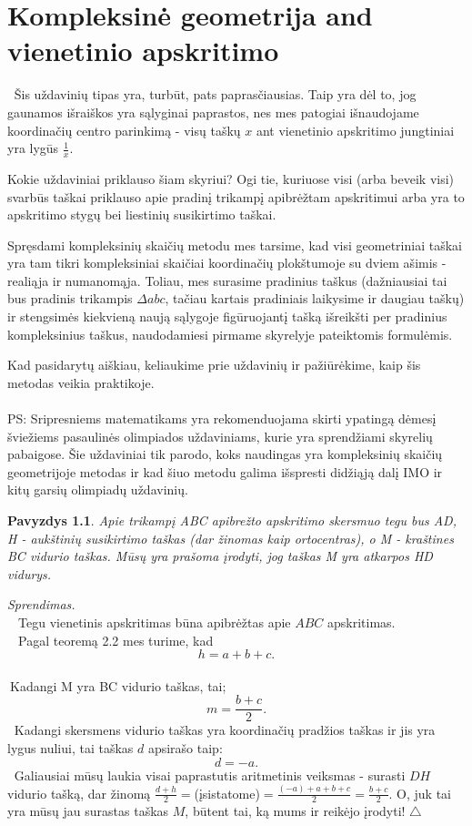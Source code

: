 \documentclass[11pt,a4paper,twoside]{book}
\newenvironment{sprendimas}{\noindent \textit{Sprendimas.}}{\hfill $\triangle$}
\newcounter{foo}[subsection]
\newtheorem{pavnr}[foo]{Pavyzdys}
\theoremstyle{definition} \newtheorem*{api}{Apibrėžimas}
\theoremstyle{remark} \newtheorem*{pastaba}{Pastaba}
\begin{document}
\chapter{Kompleksinė geometrija and vienetinio apskritimo}

 $~$ Šis uždavinių tipas yra, turbūt, pats paprasčiausias. Taip yra dėl to, jog gaunamos 
išraiškos yra sąlyginai paprastos, nes mes patogiai išnaudojame koordinačių centro parinkimą - visų taškų $x$ ant vienetinio apskritimo jungtiniai yra lygūs $\frac {1}{x}$. 
  
  
  Kokie uždaviniai priklauso šiam skyriui? Ogi tie, kuriuose visi (arba beveik visi) svarbūs taškai priklauso apie pradinį trikampį apibrėžtam apskritimui arba yra to apskritimo stygų bei liestinių susikirtimo taškai. 
  
  Spręsdami kompleksinių skaičių metodu mes tarsime, kad visi geometriniai taškai yra tam tikri kompleksiniai skaičiai koordinačių plokštumoje su dviem ašimis - realiąja ir numanomąja. Toliau, mes surasime pradinius taškus (dažniausiai tai bus pradinis trikampis $\Delta abc$, tačiau kartais pradiniais laikysime ir daugiau taškų) ir stengsimės kiekvieną naują sąlygoje figūruojantį tašką išreikšti per pradinius kompleksinius taškus, naudodamiesi pirmame skyrelyje pateiktomis formulėmis.
  
  Kad pasidarytų aiškiau, keliaukime prie uždavinių ir pažiūrėkime, kaip šis metodas veikia praktikoje.
\\
\\
PS: Sripresniems matematikams yra rekomenduojama skirti ypatingą dėmesį šviežiems
pasaulinės olimpiados uždaviniams, kurie yra sprendžiami skyrelių pabaigose. Šie
uždaviniai tik parodo, koks naudingas yra kompleksinių skaičių geometrijoje metodas
ir kad šiuo metodu galima išspresti didžiąją dalį IMO ir kitų garsių olimpiadų uždavinių.

\begin{pavnr}

Apie trikampį ABC apibrežto apskritimo skersmuo tegu bus AD, H - aukštinių susikirtimo
taškas (dar žinomas kaip ortocentras), o M - kraštines BC vidurio taškas. Mūsų yra prašoma įrodyti, jog taškas M yra atkarpos HD vidurys.
\end{pavnr}
\begin{sprendimas}
\\ $ \phantom{a}$ Tegu vienetinis apskritimas būna apibrėžtas apie $ABC$ apskritimas. 
\\ $ \phantom{a}$ Pagal teoremą 2.2 mes turime, kad
 $$ h = a+b+c.$$
 \\ $~$Kadangi M yra BC vidurio taškas, tai; $$m= \frac{b+c}{2}.$$
$ ~$   Kadangi skersmens vidurio taškas yra koordinačių pradžios taškas ir jis yra lygus nuliui, tai taškas $d$  apsirašo taip: $$d= -a.$$
$ ~$   Galiausiai mūsų laukia visai paprastutis aritmetinis veiksmas - surasti $DH$ vidurio tašką, dar žinomą $ \frac{d+h}{2} =$(įsistatome)$= \frac {(-a)+a+b+c}{2}= \frac{b+c}{2}$. O, juk tai yra mūsų jau surastas taškas $M$, būtent tai, ką mums ir reikėjo įrodyti!
\end{sprendimas}
\end{document}
